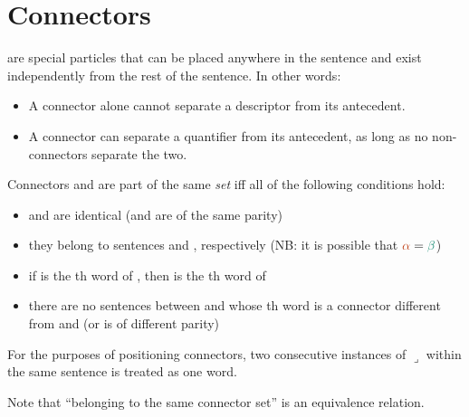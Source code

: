 \documentclass{book}
\begin{document}
\section{Connectors}


 are special particles that can be placed anywhere in the sentence \emph{} and exist independently from the rest of the sentence. In other words:

\begin{itemize}
  \item A connector alone cannot separate a descriptor from its antecedent.
  \item A connector can separate a quantifier from its antecedent, as long as no non-connectors separate the two.
\end{itemize}

Connectors  and  are part of the same \emph{set}  iff all of the following conditions hold:

\begin{itemize}
  \item {} and  are identical (and are of the same parity)
  \item they belong to sentences \hlv{$\alpha$} and \hlvi{$\beta$}, respectively (NB: it is possible that $\hlv{\alpha} = \hlvi{\beta}$)
  \item if  is the th word of \hlv{$\alpha$}, then  is the th word of \hlvi{$\beta$}
  \item there are no sentences between \hlv{$\alpha$} and \hlvi{$\beta$} whose th word is a connector different from  and  (or is of different parity)
\end{itemize}

For the purposes of positioning connectors, two consecutive instances of  $\lrcorner$ within the same sentence is treated as one word.

Note that ``belonging to the same connector set'' is an equivalence relation.
\end{document}
